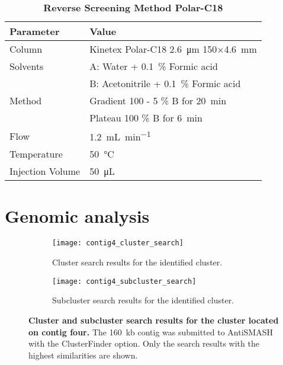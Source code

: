 	\begin{table}[htbp]
		\caption[Reverse Screening Method Polar-C18]{\textbf{Reverse Screening Method Polar-C18}}
		\label{tab:method_polarc18_revscreening}
		\centering
		\begin{tabularx}{\textwidth}{XX}
			\toprule
			\textbf{Parameter}	& \textbf{Value}	\\
			\midrule
			Column 		& Kinetex Polar-C18 \SI{2.6}{\micro\meter} 150$\times$\SI{4.6}{\milli\meter} 	\\
			Solvents	& A: Water + 0.1~\% Formic acid 	\\
						& B: Acetonitrile + 0.1~\% Formic acid		\\
			Method 		& Gradient 100 - 5 \% B for \SI{20}{\minute} 	\\
						& Plateau 100 \% B for \SI{6}{\minute} 	\\
			Flow 		& \SI{1.2}{\milli\liter\per\minute} \\
			Temperature & \SI{50}{\celsius} 	\\
			Injection Volume 	& \SI{50}{\micro\liter} 	\\
			\bottomrule
		\end{tabularx}
	\end{table}


\section*{Genomic analysis} %
\label{sec:genomic_analysis}

    \begin{figure}[htpb]
        \centering
        \begin{subfigure}[b]{\textwidth}
            \texttt{[image: contig4\_cluster\_search]}
            \caption{Cluster search results for the identified cluster.}
            \label{fig:sub1}
        \end{subfigure}

        \begin{subfigure}[b]{\textwidth}
            \texttt{[image: contig4\_subcluster\_search]}
            \caption{Subcluster search results for the identified cluster.}
            \label{fig:sub2}
        \end{subfigure}

        \caption[Cluster and subcluster search results for the cluster located on contig four.]{\textbf{Cluster and subcluster search results for the cluster located on contig four.} The 160~kb contig was submitted to AntiSMASH with the ClusterFinder option. Only the search results with the highest similarities are shown.}
        \label{fig:cluster_search}
    \end{figure}

